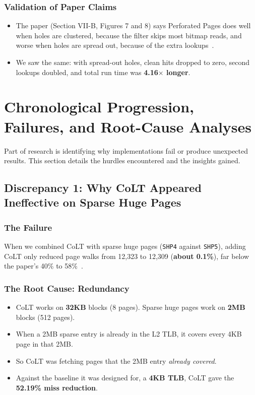 \subsubsection{Validation of Paper Claims}
\begin{itemize}
    \item The paper (Section VII-B, Figures 7 and 8) says Perforated Pages does well when holes are clustered, because the filter skips most bitmap reads, and worse when holes are spread out, because of the extra lookups~\cite{kwon2020perforated}.
    \item We saw the same: with spread-out holes, clean hits dropped to zero, second lookups doubled, and total run time was \textbf{4.16$\times$ longer}.
\end{itemize}

\section{Chronological Progression, Failures, and Root-Cause Analyses}

Part of research is identifying why implementations fail or produce unexpected results. This section details the hurdles encountered and the insights gained.

\subsection{Discrepancy 1: Why CoLT Appeared Ineffective on Sparse Huge Pages}
\subsubsection{The Failure}
When we combined CoLT with sparse huge pages (\texttt{SHP4} against \texttt{SHP5}), adding CoLT only reduced page walks from 12,323 to 12,309 (\textbf{about 0.1\%}), far below the paper's 40\% to 58\%~\cite{pham2012colt}.

\subsubsection{The Root Cause: Redundancy}
\begin{itemize}
    \item CoLT works on \textbf{32KB} blocks (8 pages). Sparse huge pages work on \textbf{2MB} blocks (512 pages).
    \item When a 2MB sparse entry is already in the L2 TLB, it covers every 4KB page in that 2MB.
    \item So CoLT was fetching pages that the 2MB entry \textit{already covered}.
    \item Against the baseline it was designed for, a \textbf{4KB TLB}, CoLT gave the \textbf{52.19\% miss reduction}.
\end{itemize}

